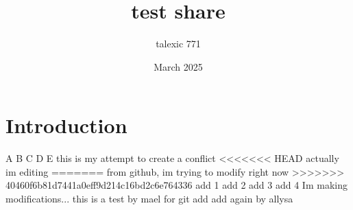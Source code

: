 \documentclass{article}
\title{test share}
\author{talexic 771 }
\date{March 2025}
\begin{document}
\maketitle

\section{Introduction}
A
B
C
D
E
this is my attempt to create a conflict
<<<<<<< HEAD
actually im editing
=======
from github, im trying to modify right now
>>>>>>> 40460f6b81d7441a0eff9d214c16bd2c6e764336
add 1
add 2
add 3
add 4
Im making modifications... 
this is a test by mael for git
add
add again by allysa
\end{document}
